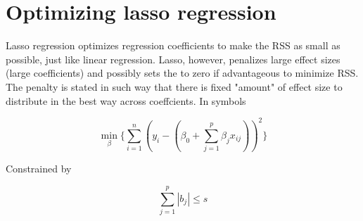 \documentclass[a4paper]{article}
\begin{document}
\section{Optimizing lasso regression}

Lasso regression optimizes regression coefficients to make the RSS as small as possible, just like linear regression.
Lasso, however, penalizes large effect sizes (large coefficients) and possibly sets the to zero if advantageous
to minimize RSS. The penalty is stated in such way that there is fixed "amount" of effect size to distribute
in the best way across coeffcients. In symbols

$$
\displaystyle{\min_{\beta} \{ \sum_{i= 1}^{n}} ( y_i - (\beta_0 + \sum_{j= 1}^{p}\beta_j x_{ij}) )^2  \}
$$

Constrained by

$$
\sum_{j= 1}^{p} |b_j| \leq s
$$
\end{document}
